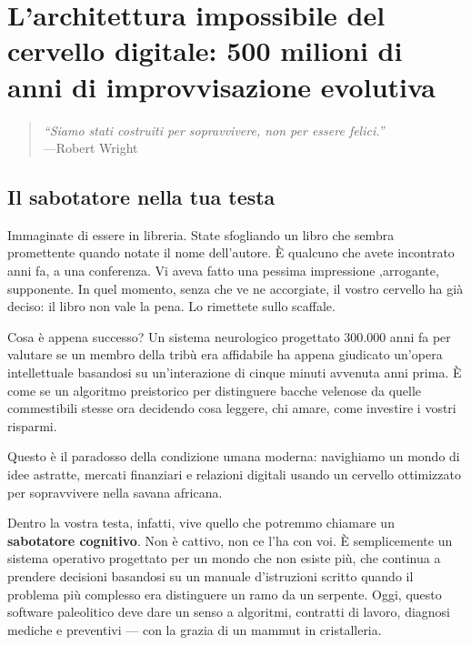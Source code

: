 \chapter{L'architettura impossibile del cervello digitale: 500 milioni di anni di improvvisazione evolutiva}

\begin{quote}
\textit{``Siamo stati costruiti per sopravvivere, non per essere felici.''}\\
\hspace*{\fill}---Robert Wright
\end{quote}

\section{Il sabotatore nella tua testa}
Immaginate di essere in libreria. State sfogliando un libro che sembra promettente quando notate il nome dell'autore. È qualcuno che avete incontrato anni fa, a una conferenza. Vi aveva fatto una pessima impressione ,arrogante, supponente. In quel momento, senza che ve ne accorgiate, il vostro cervello ha già deciso: il libro non vale la pena. Lo rimettete sullo scaffale.

Cosa è appena successo? Un sistema neurologico progettato 300.000 anni fa per valutare se un membro della tribù era affidabile ha appena giudicato un'opera intellettuale basandosi su un'interazione di cinque minuti avvenuta anni prima. È come se un algoritmo preistorico per distinguere bacche velenose da quelle commestibili stesse ora decidendo cosa leggere, chi amare, come investire i vostri risparmi.

Questo è il paradosso della condizione umana moderna: navighiamo un mondo di idee astratte, mercati finanziari e relazioni digitali usando un cervello ottimizzato per sopravvivere nella savana africana.


Dentro la vostra testa, infatti, vive quello che potremmo chiamare un \textbf{sabotatore cognitivo}. Non è cattivo, non ce l'ha con voi. È semplicemente un sistema operativo progettato per un mondo che non esiste più, che continua a prendere decisioni basandosi su un manuale d'istruzioni scritto quando il problema più complesso era distinguere un ramo da un serpente. Oggi, questo software paleolitico deve dare un senso a algoritmi, contratti di lavoro, diagnosi mediche e preventivi — con la grazia di un mammut in cristalleria.

